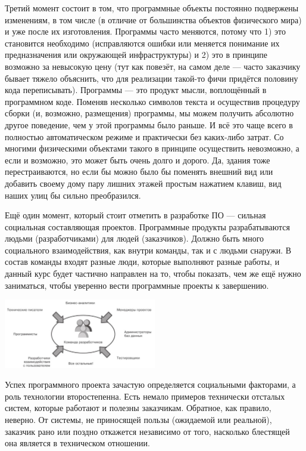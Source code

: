 \documentclass{../../text-style}
\begin{document}
Третий момент состоит в том, что программные объекты постоянно подвержены изменениям, в том числе (в отличие от большинства объектов физического мира) и уже после их изготовления. Программы часто меняются, потому что 1) это становится необходимо (исправляются ошибки или меняется понимание их предназначения или окружающей инфраструктуры) и 2) это в принципе возможно за невысокую цену (тут как повезёт, на самом деле --- часто заказчику бывает тяжело объяснить, что для реализации такой-то фичи придётся половину кода переписывать). Программы --- это продукт мысли, воплощённый в программном коде. Поменяв несколько символов текста и осуществив процедуру сборки (и, возможно, размещения) программы, мы можем получить абсолютно другое поведение, чем у этой программы было раньше. И всё это чаще всего в полностью автоматическом режиме и практически без каких-либо затрат. Со многими физическими объектами такого в принципе осуществить невозможно, а если и возможно, это может быть очень долго и дорого. Да, здания тоже перестраиваются, но если бы можно было бы поменять внешний вид или добавить своему дому пару лишних этажей простым нажатием клавиш, вид наших улиц бы сильно преобразился. 

Ещё один момент, который стоит отметить в разработке ПО --- сильная социальная составляющая проектов. Программные продукты разрабатываются людьми (разработчиками) для людей (заказчиков). Должно быть много социального взаимодействия, как внутри команды, так и с людьми снаружи. В состав команды входят разные люди, которые выполняют разные работы, и данный курс будет частично направлен на то, чтобы показать, чем же ещё нужно заниматься, чтобы уверенно вести программные проекты к завершению.

\begin{center}
    \includegraphics[width=0.5\textwidth]{team.png}
\end{center}

Успех программного проекта зачастую определяется социальными факторами, а роль технологии второстепенна. Есть немало примеров технически отсталых систем, которые работают и полезны заказчикам. Обратное, как правило, неверно. От системы, не приносящей пользы (ожидаемой или реальной), заказчик рано или поздно откажется независимо от того, насколько блестящей она является в техническом отношении.
\end{document}
